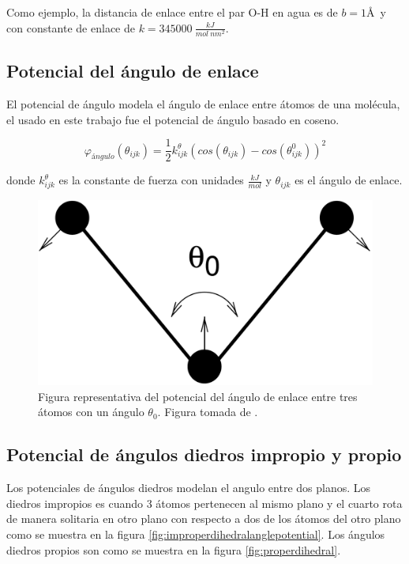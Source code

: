 Como ejemplo, la distancia de enlace entre el par O-H en agua es de $b=1$\AA\ y con constante de enlace de $k=345000\ \frac{kJ}{mol\ nm^2}$.

\subsection{Potencial del ángulo de enlace}

El potencial de ángulo modela el ángulo de enlace entre átomos de una molécula, el usado en este trabajo fue el potencial de ángulo basado en coseno.

\begin{equation}
    \varphi_{ángulo}(\theta_{ijk}) = \frac{1}{2}k^{\theta}_{ijk}\left(cos(\theta_{ijk}) - cos(\theta^{0}_{ijk})\right)^2
\end{equation}

donde $k^{\theta}_{ijk}$ es la constante de fuerza con unidades $\frac{kJ}{mol}$ y $\theta_{ijk}$ es el ángulo de enlace.\\

\begin{figure}[!h]
    \centering
    \includegraphics[width=.4\linewidth]{MD/anglepotential.png}  
    \caption{Figura representativa del potencial del ángulo de enlace entre tres átomos con un ángulo $\theta_0$. Figura tomada de \cite{gromacsdoc}.}
    \label{fig:anglepotential}
\end{figure}

\subsection{Potencial de ángulos diedros impropio y propio}

Los potenciales de ángulos diedros modelan el angulo entre dos planos. Los diedros impropios es cuando 3 átomos pertenecen al mismo plano y el cuarto rota de manera solitaria en otro plano con respecto a dos de los átomos del otro plano como se muestra en la figura \ref{fig:improperdihedralanglepotential}. Los ángulos diedros propios son como se muestra en la figura \ref{fig:properdihedral}.

